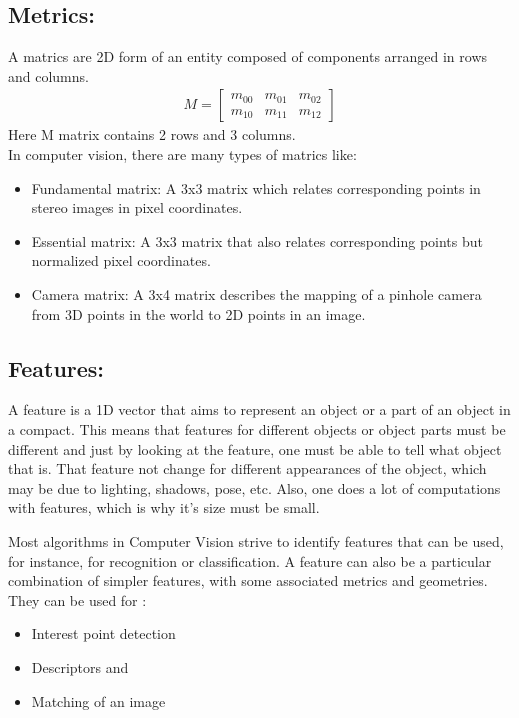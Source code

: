 \documentclass[12pt,a4paper] {article}
\begin{document}
	\subsection{Metrics:}
	A matrics are 2D form of an entity composed of components arranged in rows and columns. 
	\begin{gather}
		M = 
 		\begin{bmatrix} 
 			m_{00} & m_{01} & m_{02}\\ 
 			m_{10} & m_{11} & m_{12}
 		\end{bmatrix}
	\end{gather}
	Here M matrix contains 2 rows and 3 columns. \\
	In computer vision, there are many types of matrics like: 
	\begin{itemize}
	  \item Fundamental matrix: A 3x3 matrix which relates corresponding points in stereo images in pixel coordinates.
	  \item Essential matrix: A 3x3 matrix that also relates corresponding points but normalized pixel coordinates.
	  \item Camera matrix: A 3x4 matrix describes the mapping of a pinhole camera from 3D points in the world to 2D points in an image.
	\end{itemize}


	\subsection{Features:}
	A feature is a 1D vector that aims to represent an object or a part of an object in a compact.
	This means that features for different objects or object parts must be different and just by looking at the feature, 
	one must be able to tell what object that is. That feature not change for different appearances of the object, 
	which may be due to lighting, shadows, pose, etc. Also, one does a lot of computations with features, 
	which is why it's size must be small.

	Most algorithms in Computer Vision strive to identify features that can be used, for instance, for recognition or classification. 
	A feature can also be a particular combination of simpler features, with some associated metrics and geometries.
	They can be used for : 
	\begin{itemize}
		\item Interest point detection
		\item Descriptors and
		\item Matching of an image
	\end{itemize}
	
\end{document}
